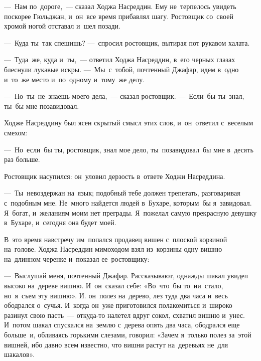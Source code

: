 \documentclass[12pt,a4paper]{book}
\begin{document}
—~Нам по~дороге,~— сказал Ходжа Насреддин. Ему не~терпелось увидеть поскорее Гюльджан, и~он~все время прибавлял шагу. Ростовщик со~своей хромой ногой отставал и~шел позади.

—~Куда ты~так спешишь? —~спросил ростовщик, вытирая пот рукавом халата.

—~Туда~же, куда и~ты,~— ответил Ходжа Насреддин, в~его черных глазах блеснули лукавые искры. —~Мы~с~тобой, почтенный Джафар, идем в~одно и~то~же место и~по~одному и~тому~же делу.

—~Но~ты~не~знаешь моего дела,~— сказал ростовщик. —~Если~бы ты~знал, ты~бы мне позавидовал.

Ходже Насреддину был ясен скрытый смысл этих слов, и~он~ответил с~веселым смехом:

—~Но~если~бы ты, ростовщик, знал мое дело, ты~позавидовал~бы мне в~десять раз больше.

Ростовщик насупился: он~уловил дерзость в~ответе Ходжи Насреддина.

—~Ты~невоздержан на~язык; подобный тебе должен трепетать, разговаривая с~подобным мне. Не~много найдется людей в~Бухаре, которым~бы я~завидовал. Я~богат, и~желаниям моим нет преграды. Я~пожелал самую прекрасную девушку в~Бухаре, и~сегодня она будет моей.

В~это время навстречу им~попался продавец вишен с~плоской корзиной на~голове. Ходжа Насреддин мимоходом взял из~корзины одну вишню на~длинном черенке и~показал ее~ростовщику:

—~Выслушай меня, почтенный Джафар. Рассказывают, однажды шакал увидел высоко на~дереве вишню. И~он~сказал себе: «Во~что~бы то~ни~стало, но~я~съем эту вишню». И. он~полез на~дерево, лез туда два часа и~весь ободрался о~сучья. И~когда он~уже приготовился полакомиться и~широко разинул свою пасть~— откуда-то налетел вдруг сокол, схватил вишню и~унес. И~потом шакал спускался на~землю с~дерева опять два часа, ободрался еще больше~и, обливаясь горькими слезами, говорил: «Зачем я~только полез за~этой вишней, ибо давно всем известно, что вишни растут на~деревьях не~для шакалов».
\end{document}
